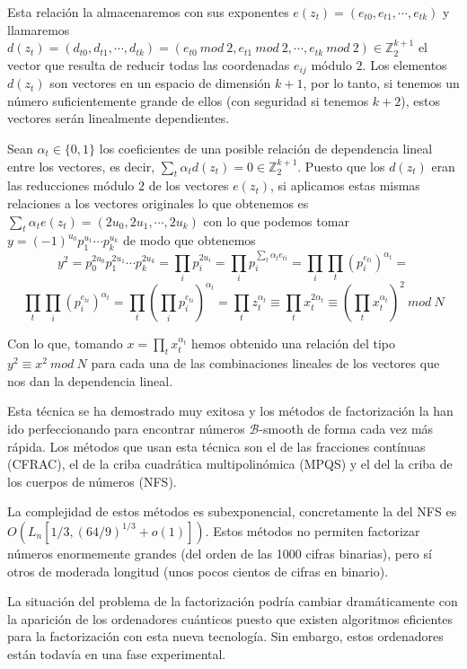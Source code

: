 Esta relaci\'on la almacenaremos con sus exponentes $e(z_t) = (e_{t0},e_{t1},\cdots,e_{tk})$ y llamaremos
$d(z_t) = (d_{t0},d_{t1},\cdots,d_{tk}) = (e_{t0}~mod~2,e_{t1}~mod~2,\cdots,e_{tk}~mod~2) \in
{\mathbb Z}_2^{k+1}$ el vector que resulta de reducir todas las coordenadas $e_{ij}$ m\'odulo $2$.
Los elementos $d(z_t)$ son vectores en un espacio de dimensi\'on $k+1$, por lo tanto,
si tenemos un n\'umero suficientemente grande de ellos (con seguridad si tenemos $k+2$), estos
vectores ser\'an linealmente dependientes.

Sean $\alpha_t \in \{0,1\}$ los coeficientes de una posible relaci\'on de dependencia lineal entre los
vectores, es decir, $\sum_{t} \alpha_t d(z_t) = 0 \in {\mathbb Z}_2^{k+1}$. Puesto que los $d(z_t)$ eran las reducciones m\'odulo $2$ de los vectores $e(z_t)$, si
aplicamos estas mismas relaciones a los vectores originales lo que obtenemos es $\sum_t \alpha_t e(z_t) = (2u_0, 2u_1, \cdots, 2u_k)$ con lo que podemos
tomar $y= (-1)^{u_0} p_1 ^ {u_1} \cdots p_k^{u_k}$ de modo que obtenemos
\[
y^2 =  p_0^{2u_0} p_1 ^ {2u_1} \cdots p_k^{2u_k} = \prod_{i} p_i^{2u_i} = \prod_i p_i^{\sum_t \alpha_t e_{ti}} =
\prod_i \prod_t \left(p_i^{e_{ti}}\right)^{\alpha_t} = \] \[\prod_t \prod_i \left(p_i^{e_{ti}}\right)^{\alpha_t} = \prod_t \left(\prod_i p_i^{e_{ti}}\right)^{\alpha_t} = \prod_t z_t^{\alpha_t} \equiv
\prod_t x_t^{2\alpha_t} \equiv \left( \prod_t x_t^{\alpha_t}\right)^2~mod~N
\]

Con lo que, tomando $x = \prod_t x_t^{\alpha_t}$ hemos obtenido una relaci\'on del tipo $y^2 \equiv x^2~mod~N$ para cada una de las combinaciones lineales de los
vectores que nos dan la dependencia lineal.

Esta t\'ecnica se ha demostrado muy exitosa y los m\'etodos de factorizaci\'on la han ido perfeccionando para encontrar n\'umeros ${\mathcal B}$-smooth de forma cada
vez m\'as r\'apida. Los m\'etodos que usan esta t\'ecnica son el de las fracciones cont\'inuas (CFRAC), el de la criba cuadr\'atica multipolin\'omica (MPQS) y el del
la criba de los cuerpos de n\'umeros (NFS).

La complejidad de estos m\'etodos es subexponencial, concretamente la del NFS es $O(L_n[1/3,(64/9)^{1/3} + o(1)])$. Estos m\'etodos no permiten factorizar n\'umeros
enormemente grandes (del orden de las 1000 cifras binarias), pero s\'i otros de moderada longitud (unos pocos cientos de cifras en binario).

La situaci\'on del problema de la factorizaci\'on podr\'ia cambiar dram\'aticamente con la aparici\'on de los ordenadores cu\'anticos puesto que existen algoritmos
eficientes para la factorizaci\'on con esta nueva tecnolog\'ia. Sin embargo, estos ordenadores est\'an todav\'ia en una fase experimental.


